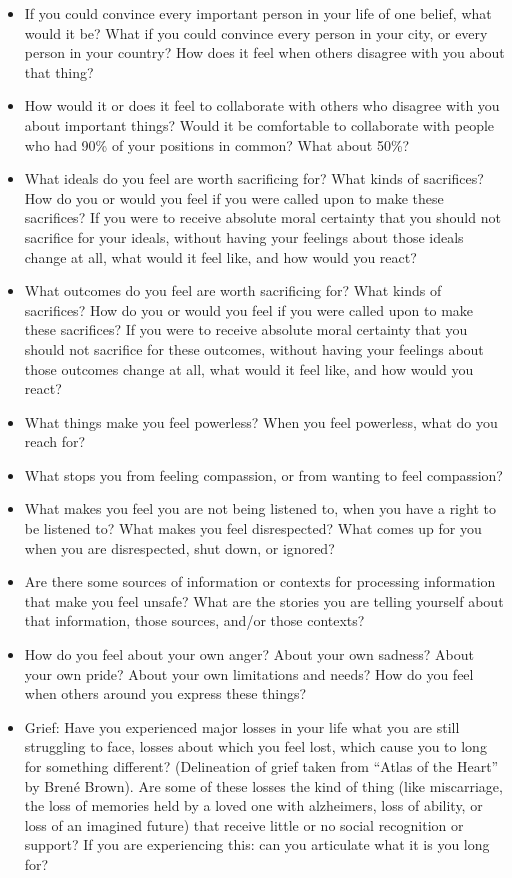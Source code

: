 \documentclass[12pt,letterpaper]{article}
\begin{document}
\begin{itemize}
    \item If you could convince every important person in your life of one belief, what would it be?  What if you could convince every person in your city, or every person in your country? How does it feel when others disagree with you about that thing?
    \item How would it or does it feel to collaborate with others who disagree with you about important things? Would it be comfortable to collaborate with people who had 90\% of your positions in common? What about 50\%?
    \item What ideals do you feel are worth sacrificing for? What kinds of sacrifices? How do you or would you feel if you were called upon to make these sacrifices? If you were to receive absolute moral certainty that you should not sacrifice for your ideals, without having your feelings about those ideals change at all, what would it feel like, and how would you react?
    \item What outcomes do you feel are worth sacrificing for? What kinds of sacrifices? How do you or would you feel if you were called upon to make these sacrifices? If you were to receive absolute moral certainty that you should not sacrifice for these outcomes, without having your feelings about those outcomes change at all, what would it feel like, and how would you react?
    \item What things make you feel powerless? When you feel powerless, what do you reach for?
    \item What stops you from feeling compassion, or from wanting to feel compassion?
    \item What makes you feel you are not being listened to, when you have a right to be listened to? What makes you feel disrespected? What comes up for you when you are disrespected, shut down, or ignored?
    \item Are there some sources of information or contexts for processing information that make you feel unsafe? What are the stories you are telling yourself about that information, those sources, and/or those contexts?
    \item How do you feel about your own anger? About your own sadness? About your own pride? About your own limitations and needs? How do you feel when others around you express these things?
    \item Grief: Have you experienced major losses in your life what you are still struggling to face, losses about which you feel lost, which cause you to long for something different? (Delineation of grief taken from “Atlas of the Heart” by Brené Brown). Are some of these losses the kind of thing (like miscarriage, the loss of memories held by a loved one with alzheimers, loss of ability, or loss of an imagined future) that receive little or no social recognition or support? If you are experiencing this: can you articulate what it is you long for?

\end{itemize}
\end{document}
